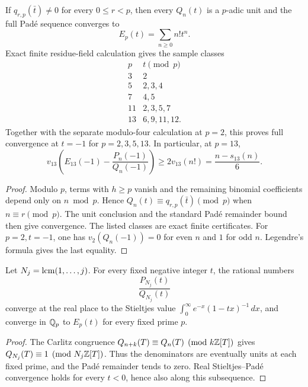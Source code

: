 \begin{theorem}
\label{thm:transfer-padic-residue}
If \(q_{r,p}(\bar t)\ne0\) for every \(0\le r<p\), then every
\(Q_n(t)\) is a \(p\)-adic unit and the full Pad\'e sequence converges to
\[
 E_p(t)=\sum_{n\ge0}n!t^n.
\]
Exact finite residue-field calculation gives the sample classes
\[
\begin{array}{c|l}
p& t\pmod p\\ \hline
3&2\\
5&2,3,4\\
7&4,5\\
11&2,3,5,7\\
13&6,9,11,12.
\end{array}
\]
Together with the separate modulo-four calculation at \(p=2\), this proves
full convergence at \(t=-1\) for \(p=2,3,5,13\).  In particular, at
\(p=13\),
\[
 v_{13}\!\left(E_{13}(-1)-\frac{P_n(-1)}{Q_n(-1)}\right)
 \ge2v_{13}(n!)=\frac{n-s_{13}(n)}6.
\]
\end{theorem}

\begin{proof}
Modulo \(p\), terms with \(h\ge p\) vanish and the remaining binomial
coefficients depend only on \(n\bmod p\).  Hence
\(Q_n(t)\equiv q_{r,p}(\bar t)\pmod p\) when \(n\equiv r\pmod p\).
The unit conclusion and the standard Pad\'e remainder bound then give
convergence.  The listed classes are exact finite certificates.  For
\(p=2,t=-1\), one has \(v_2(Q_n(-1))=0\) for even \(n\) and \(1\) for odd
\(n\).  Legendre's formula gives the last equality.
\end{proof}

\begin{theorem}
\label{thm:transfer-common-subsequence}
Let \(N_j=\operatorname{lcm}(1,\ldots,j)\).  For every fixed negative integer \(t\),
the rational numbers
\[
 \frac{P_{N_j}(t)}{Q_{N_j}(t)}
\]
converge at the real place to the Stieltjes value
\(\int_0^\infty e^{-x}(1-tx)^{-1}\,dx\), and converge in \(\mathbb Q_p\) to
\(E_p(t)\) for every fixed prime \(p\).
\end{theorem}

\begin{proof}
The Carlitz congruence
\(Q_{n+k}(T)\equiv Q_n(T)\pmod{k\mathbb Z[T]}\) gives
\(Q_{N_j}(T)\equiv1\pmod{N_j\mathbb Z[T]}\).  Thus the denominators are eventually
units at each fixed prime, and the Pad\'e remainder tends to zero.  Real
Stieltjes--Pad\'e convergence holds for every \(t<0\), hence also along
this subsequence.
\end{proof}

